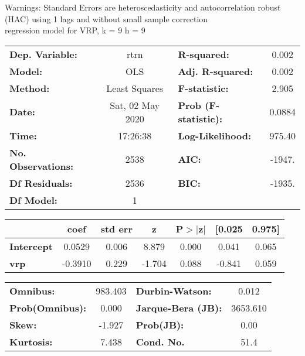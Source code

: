 Warnings: \newline
 [1] Standard Errors are heteroscedasticity and autocorrelation robust (HAC) using 1 lags and without small sample correction\\ 

regression model for VRP, k = 9 h = 9\begin{center}
\begin{tabular}{lclc}
\toprule
\textbf{Dep. Variable:}    &       rtrn       & \textbf{  R-squared:         } &     0.002   \\
\textbf{Model:}            &       OLS        & \textbf{  Adj. R-squared:    } &     0.002   \\
\textbf{Method:}           &  Least Squares   & \textbf{  F-statistic:       } &     2.905   \\
\textbf{Date:}             & Sat, 02 May 2020 & \textbf{  Prob (F-statistic):} &   0.0884    \\
\textbf{Time:}             &     17:26:38     & \textbf{  Log-Likelihood:    } &    975.40   \\
\textbf{No. Observations:} &        2538      & \textbf{  AIC:               } &    -1947.   \\
\textbf{Df Residuals:}     &        2536      & \textbf{  BIC:               } &    -1935.   \\
\textbf{Df Model:}         &           1      & \textbf{                     } &             \\
\bottomrule
\end{tabular}
\begin{tabular}{lcccccc}
                   & \textbf{coef} & \textbf{std err} & \textbf{z} & \textbf{P$> |$z$|$} & \textbf{[0.025} & \textbf{0.975]}  \\
\midrule
\textbf{Intercept} &       0.0529  &        0.006     &     8.879  &         0.000        &        0.041    &        0.065     \\
\textbf{vrp}       &      -0.3910  &        0.229     &    -1.704  &         0.088        &       -0.841    &        0.059     \\
\bottomrule
\end{tabular}
\begin{tabular}{lclc}
\textbf{Omnibus:}       & 983.403 & \textbf{  Durbin-Watson:     } &    0.012  \\
\textbf{Prob(Omnibus):} &   0.000 & \textbf{  Jarque-Bera (JB):  } & 3653.610  \\
\textbf{Skew:}          &  -1.927 & \textbf{  Prob(JB):          } &     0.00  \\
\textbf{Kurtosis:}      &   7.438 & \textbf{  Cond. No.          } &     51.4  \\
\bottomrule
\end{tabular}
\end{center}

